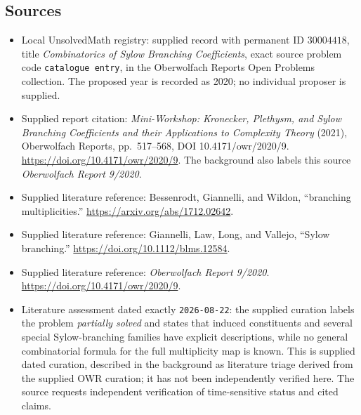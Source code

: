 \documentclass[11pt]{article}
\begin{document}
\subsection{Sources}
\begin{itemize}
\item Local UnsolvedMath registry: supplied record with permanent ID \(30004418\), title \emph{Combinatorics of Sylow Branching Coefficients}, exact source problem code \texttt{catalogue entry}, in the Oberwolfach Reports Open Problems collection. The proposed year is recorded as 2020; no individual proposer is supplied.
\item Supplied report citation: \emph{Mini-Workshop: Kronecker, Plethysm, and Sylow Branching Coefficients and their Applications to Complexity Theory} (2021), Oberwolfach Reports, pp.\ 517--568, DOI 10.4171/owr/2020/9. \url{https://doi.org/10.4171/owr/2020/9}. The background also labels this source \emph{Oberwolfach Report 9/2020}.
\item Supplied literature reference: Bessenrodt, Giannelli, and Wildon, ``branching multiplicities.'' \url{https://arxiv.org/abs/1712.02642}.
\item Supplied literature reference: Giannelli, Law, Long, and Vallejo, ``Sylow branching.'' \url{https://doi.org/10.1112/blms.12584}.
\item Supplied literature reference: \emph{Oberwolfach Report 9/2020}. \url{https://doi.org/10.4171/owr/2020/9}.
\item Literature assessment dated exactly \texttt{2026-08-22}: the supplied curation labels the problem \emph{partially solved} and states that induced constituents and several special Sylow-branching families have explicit descriptions, while no general combinatorial formula for the full multiplicity map is known. This is supplied dated curation, described in the background as literature triage derived from the supplied OWR curation; it has not been independently verified here. The source requests independent verification of time-sensitive status and cited claims.
\end{itemize}
\end{document}
